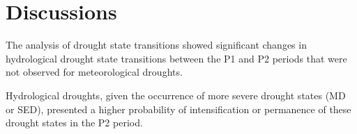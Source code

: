 \section{Discussions}

    The analysis of drought state transitions showed significant changes in hydrological drought state transitions between the P1 and P2 periods that were not observed for meteorological droughts. 
    
    Hydrological droughts, given the occurrence of more severe drought states (MD or SED), presented a higher probability of intensification or permanence of these drought states in the P2 period.

